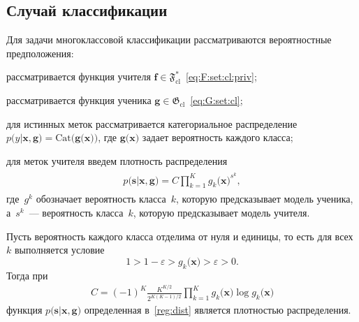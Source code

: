 \documentclass[12pt]{a&t}
\begin{document}
\subsection{Случай классификации}
Для задачи многоклассовой классификации рассматриваются вероятностные предположения:
\begin{enumlist}
\label{st:class:1}
	\item рассматривается функция учителя $\mathbf{f}\in\mathfrak{F}_{\text{cl}}^{*}$~\eqref{eq:F:set:cl:priv};
	\item рассматривается функция ученика   $\mathbf{g}\in\mathfrak{G}_{\text{cl}}$~\eqref{eq:G:set:cl};
	\item для истинных меток рассматривается категориальное распределение~$p\bigr(y|\mathbf{x}, \mathbf{g}\bigr) = \text{Cat}\bigr(\mathbf{g}\bigr(\mathbf{x}\bigr)\bigr)$, где $\mathbf{g}\bigr(\mathbf{x}\bigr)$ задает вероятность каждого класса;
	\item для меток учителя введем плотность распределения
\begin{gather}
\label{reg:dist}
\begin{aligned}
	p\bigr(\mathbf{s}|\mathbf{x}, \mathbf{g}\bigr) = C\prod_{k=1}^{K}g_k\bigr(\mathbf{x}\bigr)^{s^k},
\end{aligned}
\end{gather}
где~$g^k$ обозначает вероятность класса~$k$, которую предсказывает модель ученика, а~$s^k$~--- вероятность класса~$k$, которую предсказывает модель учителя.
\end{enumlist}
\begin{theorem}
\label{theorem:st:dist}
Пусть вероятность каждого класса отделима от нуля и единицы, то есть для всех $k$ выполняется условие
\[1 > 1- \varepsilon > g_k\bigr(\mathbf{x}\bigr) > \varepsilon > 0.
\]
Тогда при
\begin{gather}
C=\left(-1\right)^{K}\frac{K^{K/2}}{2^{K(K-1)/2}}\prod_{k=1}^{K}g_k\bigr(\mathbf{x}\bigr)\log g_k\bigr(\mathbf{x}\bigr)
\end{gather}
функция $p\bigr(\mathbf{s}|\mathbf{x}, \mathbf{g}\bigr)$ определенная в~\eqref{reg:dist} является плотностью распределения.
\end{theorem}
\end{document}
